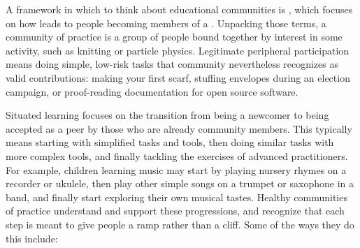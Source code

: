 A framework in which to think about educational communities is
, which focuses on
how  leads to people becoming members of a
\cite{Weng2015}.  Unpacking those terms, a community of practice is a
group of people bound together by interest in some activity, such as
knitting or particle physics. Legitimate peripheral participation
means doing simple, low-risk tasks that community nevertheless
recognizes as valid contributions: making your first scarf, stuffing
envelopes during an election campaign, or proof-reading documentation
for open source software.

Situated learning focuses on the transition from being a newcomer to
being accepted as a peer by those who are already community members.
This typically means starting with simplified tasks and tools, then
doing similar tasks with more complex tools, and finally tackling the
exercises of advanced practitioners. For example, children learning
music may start by playing nursery rhymes on a recorder or ukulele,
then play other simple songs on a trumpet or saxophone in a band, and
finally start exploring their own musical tastes. Healthy communities
of practice understand and support these progressions, and recognize
that each step is meant to give people a ramp rather than a cliff.
Some of the ways they do this include:

